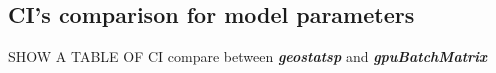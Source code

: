 \documentclass{article}\usepackage[]{graphicx}\usepackage[]{color}
\newcommand{\pkg}[1]{\textbf{\emph{#1}}}
\newcommand{\fct}[1]{\textit{#1()}}
\def\var{{\mathrm{Var}}}
\def\T{{\footnotesize {^{_{\sf T}}}}}
\begin{document}
% 





\subsection{CI’s comparison for model parameters}
%

%

SHOW A TABLE OF CI compare between \pkg{geostatsp} and \pkg{gpuBatchMatrix}
\end{document}
